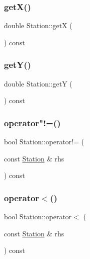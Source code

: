 \subsubsection{\texorpdfstring{get\+X()}{getX()}}
{\footnotesize\ttfamily double Station\+::getX (\begin{DoxyParamCaption}{ }\end{DoxyParamCaption}) const}

\mbox{\label{classanen_sta_1_1_station_aadddb2db193456d14bae16dbf2b8259f}} 
\subsubsection{\texorpdfstring{get\+Y()}{getY()}}
{\footnotesize\ttfamily double Station\+::getY (\begin{DoxyParamCaption}{ }\end{DoxyParamCaption}) const}

\mbox{\label{classanen_sta_1_1_station_ac72abea3ad4afc0155b34af7d3c98bd8}} 
\subsubsection{\texorpdfstring{operator"!=()}{operator!=()}}
{\footnotesize\ttfamily bool Station\+::operator!= (\begin{DoxyParamCaption}\item[{const \mbox{\hyperlink{classanen_sta_1_1_station}{Station}} \&}]{rhs }\end{DoxyParamCaption}) const}

\mbox{\label{classanen_sta_1_1_station_ad49b12012cb13c9f806587d9aa4c6fc9}} 
\subsubsection{\texorpdfstring{operator$<$()}{operator<()}}
{\footnotesize\ttfamily bool Station\+::operator$<$ (\begin{DoxyParamCaption}\item[{const \mbox{\hyperlink{classanen_sta_1_1_station}{Station}} \&}]{rhs }\end{DoxyParamCaption}) const}

